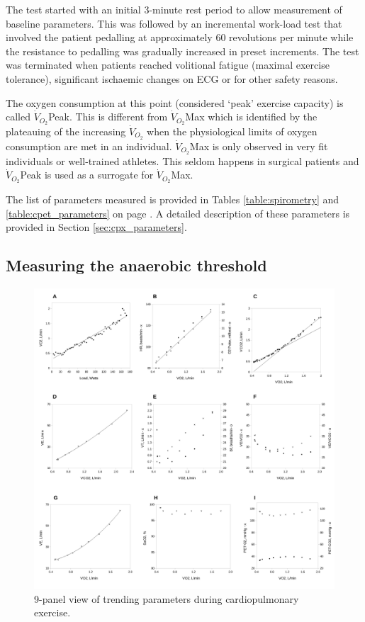 The test started with an initial 3-minute rest period to allow measurement of baseline parameters. 
This was followed by an incremental work-load test that involved the patient pedalling at approximately 60 revolutions per minute while the resistance to pedalling was gradually increased in preset increments. 
The test was terminated when patients reached volitional fatigue (maximal exercise tolerance), significant ischaemic changes on ECG or for other safety reasons. 

The oxygen consumption at this point (considered `peak' exercise capacity) is called $\dot{V}_{O_2}$Peak.
This is different from $\dot{V}_{O_2}$Max which is identified by the plateauing of the increasing $\dot{V}_{O_2}$ when the physiological limits of oxygen consumption are met in an individual.
$\dot{V}_{O_2}$Max is only observed in very fit individuals or well-trained athletes.
This seldom happens in surgical patients and $\dot{V}_{O_2}$Peak is used as a surrogate for $\dot{V}_{O_2}$Max.

The list of parameters measured is provided in Tables \ref{table:spirometry} and \ref{table:cpet_parameters} on page \pageref{table:spirometry}.
A detailed description of these parameters is provided in Section \ref{sec:cpx_parameters}.

\subsection{Measuring the anaerobic threshold}
\label{sec:cpx_at_method}

\begin{figure}[htbp]
	\centering
	\includegraphics[width=\textwidth]{Figures/cpet_9panel.pdf}
	\caption{9-panel view of trending parameters during cardiopulmonary exercise.}
	\label{fig:cpet_9panel}
\end{figure}

